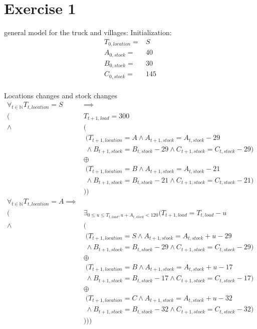\chapter{Exercise 1}
general model for the truck and villages:
Initialization:
\begin{align*}
T_{0,location} =& S \\
A_{0,stock} =& 40 \\
B_{0,stock} =& 30 \\
C_{0,stock} =& 145 \\
\end{align*}

Locations changes and stock changes
\begin{align*}
\forall_{t \in \mathbb{N}}T_{t,location}=S& \implies \\
				  (&T_{t+1,load} = 300 \\
		   \land  &( \\
			   &\; (T_{t+1,location}=A \land A_{t+1,stock} = A_{t,stock}-29 \\
			   &\; \land B_{t+1,stock} = B_{t,stock}-29 \land C_{t+1,stock} = C_{t,stock}-29) \\
			   &\oplus \\
			   &\; (T_{t+1,location}=B \land A_{t+1,stock} = A_{t,stock}-21 \\
			   &\; \land B_{t+1,stock} = B_{t,stock}-21 \land C_{t+1,stock} = C_{t,stock}-21) \\
			   &)) \\
\forall_{t \in \mathbb{N}}T_{t,location}=A \implies \\
				  (&\exists_{0 \le u \le T_{t,load},u+A_{t,stock}<120}( T_{t+1,load} = T_{t,load}-u \\
		   \land  &( \\
		   &\; (T_{t+1,location}=S \land A_{t+1,stock} = A_{t,stock}+u-29 \\
		   &\; \land B_{t+1,stock} = B_{t,stock}-29 \land C_{t+1,stock} = C_{t,stock}-29) \\
		   &\oplus \\
		   &\;(T_{t+1,location}=B \land A_{t+1,stock} = A_{t,stock}+u-17 \\
		   &\; \land B_{t+1,stock} = B_{t,stock}-17 \land C_{t+1,stock} = C_{t,stock}-17) \\
           &\oplus \\
           &\; (T_{t+1,location}=C \land A_{t+1,stock} = A_{t,stock}+u-32 \\
           &\; \land B_{t+1,stock} = B_{t,stock}-32 \land C_{t+1,stock} = C_{t,stock}-32) \\
           &)))
\end{align*}


